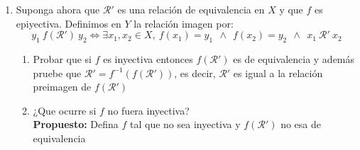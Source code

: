 \documentclass[10pt]{article}
\theoremstyle{plain}
\theoremstyle{definition}
\begin{document}
\begin{enumerate}[label=\textbf{P\arabic*.-}]
\begin{enumerate}
            \item Suponga ahora que $\mathcal{R'}$ es una relación de equivalencia en $X$ y que $f$ es epiyectiva. Definimos en $Y$ la relación imagen por:
                    $$ y_1 ~ f(\mathcal{R'}) ~ y_2 \iff \exists x_1 ,x_2 \in X, ~ f(x_1)=y_1 ~~ \land ~~ f(x_2)=y_2 ~~ \land ~~ x_1 ~\mathcal{R'}~ x_2 $$ 
                \begin{enumerate}
                    \item Probar que si $f$ es inyectiva entonces $f(\mathcal{R'})$ es de equivalencia y además pruebe que $\mathcal{R'}=f^{-1}(f(\mathcal{R'}))$, es decir, $\mathcal{R'}$ es igual a la relación preimagen de $f(\mathcal{R'})$
                    \item ¿Que ocurre si $f$ no fuera inyectiva?\\
                    \textbf{Propuesto:} Defina $f$ tal que no sea inyectiva y $f(\mathcal{R'})$ no esa de equivalencia
                \end{enumerate}
        \end{enumerate}

\end{enumerate}
            

\end{document}

